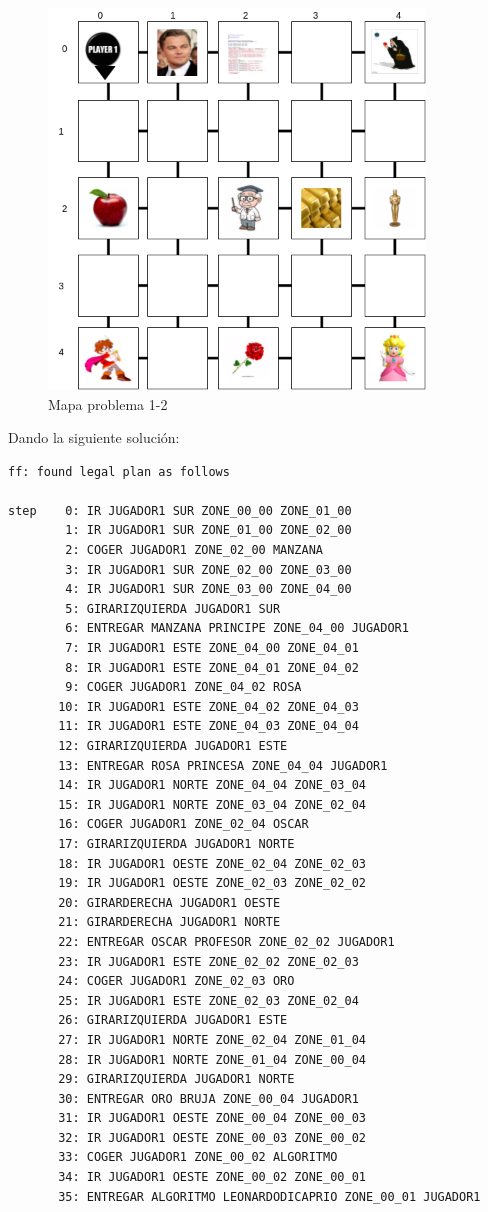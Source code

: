 \documentclass[12pt]{article}
\begin{document}
\begin{figure}[H] 
	\centering
	\includegraphics[width=10cm]{Ej1_2.png}
	\caption{Mapa problema 1-2}
\end{figure}

Dando la siguiente solución: 

\begin{verbatim}
ff: found legal plan as follows

step    0: IR JUGADOR1 SUR ZONE_00_00 ZONE_01_00
        1: IR JUGADOR1 SUR ZONE_01_00 ZONE_02_00
        2: COGER JUGADOR1 ZONE_02_00 MANZANA
        3: IR JUGADOR1 SUR ZONE_02_00 ZONE_03_00
        4: IR JUGADOR1 SUR ZONE_03_00 ZONE_04_00
        5: GIRARIZQUIERDA JUGADOR1 SUR
        6: ENTREGAR MANZANA PRINCIPE ZONE_04_00 JUGADOR1
        7: IR JUGADOR1 ESTE ZONE_04_00 ZONE_04_01
        8: IR JUGADOR1 ESTE ZONE_04_01 ZONE_04_02
        9: COGER JUGADOR1 ZONE_04_02 ROSA
       10: IR JUGADOR1 ESTE ZONE_04_02 ZONE_04_03
       11: IR JUGADOR1 ESTE ZONE_04_03 ZONE_04_04
       12: GIRARIZQUIERDA JUGADOR1 ESTE
       13: ENTREGAR ROSA PRINCESA ZONE_04_04 JUGADOR1
       14: IR JUGADOR1 NORTE ZONE_04_04 ZONE_03_04
       15: IR JUGADOR1 NORTE ZONE_03_04 ZONE_02_04
       16: COGER JUGADOR1 ZONE_02_04 OSCAR
       17: GIRARIZQUIERDA JUGADOR1 NORTE
       18: IR JUGADOR1 OESTE ZONE_02_04 ZONE_02_03
       19: IR JUGADOR1 OESTE ZONE_02_03 ZONE_02_02
       20: GIRARDERECHA JUGADOR1 OESTE
       21: GIRARDERECHA JUGADOR1 NORTE
       22: ENTREGAR OSCAR PROFESOR ZONE_02_02 JUGADOR1
       23: IR JUGADOR1 ESTE ZONE_02_02 ZONE_02_03
       24: COGER JUGADOR1 ZONE_02_03 ORO
       25: IR JUGADOR1 ESTE ZONE_02_03 ZONE_02_04
       26: GIRARIZQUIERDA JUGADOR1 ESTE
       27: IR JUGADOR1 NORTE ZONE_02_04 ZONE_01_04
       28: IR JUGADOR1 NORTE ZONE_01_04 ZONE_00_04
       29: GIRARIZQUIERDA JUGADOR1 NORTE
       30: ENTREGAR ORO BRUJA ZONE_00_04 JUGADOR1
       31: IR JUGADOR1 OESTE ZONE_00_04 ZONE_00_03
       32: IR JUGADOR1 OESTE ZONE_00_03 ZONE_00_02
       33: COGER JUGADOR1 ZONE_00_02 ALGORITMO
       34: IR JUGADOR1 OESTE ZONE_00_02 ZONE_00_01
       35: ENTREGAR ALGORITMO LEONARDODICAPRIO ZONE_00_01 JUGADOR1
\end{verbatim}
\end{document}
